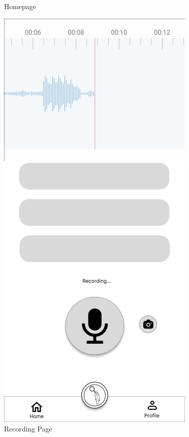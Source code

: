 \begin{figure}[h!]
\begin{minipage}[b]{0.4\linewidth}
        \caption{Homepage}
    \end{minipage}
    \hspace{1cm}
    \begin{minipage}[b]{0.4\linewidth}
        \includegraphics[width=\linewidth]{images/RecordingPage.png}
        \caption{Recording Page }
    \end{minipage}
\end{figure}
\newpage

